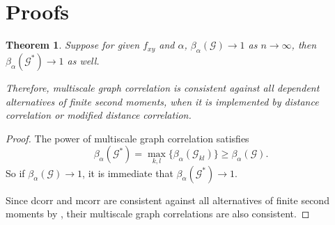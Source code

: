 \documentclass[11pt]{article}
\newcommand{\G}{\mathcal{G}}
\newtheorem{appThm}{Theorem}
\begin{document}

\section{Proofs}
\label{appen:proofs}
\begin{appThm}
Suppose for given $f_{xy}$ and $\alpha$, $\beta_{\alpha}(\G) \rightarrow 1$ as $n \rightarrow \infty$, then $\beta_{\alpha}(\G^{*}) \rightarrow 1$ as well.

Therefore, multiscale graph correlation is consistent against all dependent alternatives of finite second moments, when it is implemented by distance correlation or modified distance correlation.
\end{appThm}
\begin{proof}
The power of multiscale graph correlation satisfies
\begin{equation}
\beta_{\alpha}(\G^{*})=\max_{k,l}\{\beta_{\alpha}(\G_{kl})\} \geq \beta_{\alpha}(\G).
\end{equation}
So if $\beta_{\alpha}(\G) \rightarrow 1$, it is immediate that $\beta_{\alpha}(\G^{*}) \rightarrow 1$.

Since dcorr and mcorr are consistent against all alternatives of finite second moments by \cite{SzekelyRizzoBakirov2007, SzekelyRizzo2013a}, their multiscale graph correlations are also consistent.
\end{proof}
\end{document}
